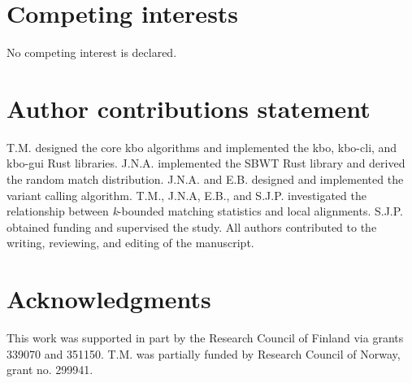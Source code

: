 \documentclass[unnumsec,webpdf,modern,large]{biorxiv}%
\theoremstyle{thmstyleone}%
\theoremstyle{thmstyletwo}%
\theoremstyle{thmstylethree}%
\begin{document}
\section{Competing interests}
No competing interest is declared.

\section{Author contributions statement}
T.M. designed the core kbo algorithms and implemented the kbo, kbo-cli, and kbo-gui Rust libraries. J.N.A. implemented the SBWT Rust library and derived the random match distribution. J.N.A. and E.B. designed and implemented the variant calling algorithm. T.M., J.N.A, E.B., and S.J.P. investigated the relationship between \emph{k}-bounded matching statistics and local alignments. S.J.P. obtained funding and supervised the study. All authors contributed to the writing, reviewing, and editing of the manuscript.

\section{Acknowledgments}
This work was supported in part by the Research Council of Finland via grants 339070 and 351150. T.M. was partially funded by Research Council of Norway, grant no. 299941.

%
%






%
%
\end{document}
